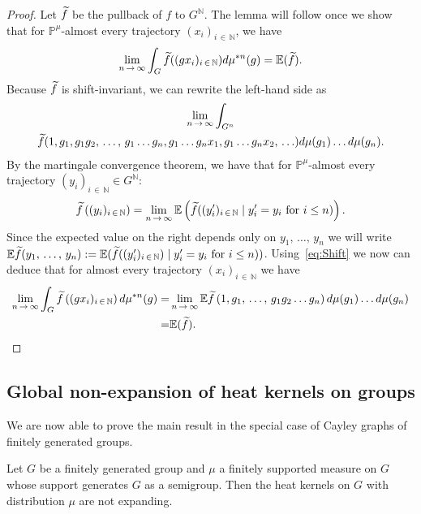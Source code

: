 \documentclass[AHL,Unicode,longabstracts,published]{cedram}
\newcommand{\bbN}{\mathbb{N}}
\newcommand{\bbE}{\mathbb{E}}
\newcommand{\bbP}{\mathbb{P}}
\let\oldtilde\tilde
\renewcommand*{\tilde}[1]{\mathchoice{\widetilde{#1}}{\widetilde{#1}}{\oldtilde{#1}}{\oldtilde{#1}}}
\begin{document}
\begin{proof}
Let $\tilde f$ be the pullback of $f$ to $G^\bbN$. The lemma will follow once we show that for $\bbP^\mu$-almost every trajectory $(x_i)_{i\,\in\,\bbN}$, we have
\[
\lim_{n\,\to\,\infty}\int_G \tilde f((gx_i)_{i\,\in\,\bbN})d\mu^{\ast n}(g)=\bbE(\tilde f).
\]
Because $\tilde f$ is shift-invariant, we can rewrite the left-hand side as
\begin{multline}\label{eq:Shift}
\lim_{n\,\to\,\infty}\int_{G^n}\\ \tilde f(1,g_1,g_1g_2,\,\ldots,\,g_1\ldots g_n,g_1\ldots g_nx_1,g_1\ldots g_nx_2,\,\ldots) d\mu(g_1)\ldots d\mu(g_n).
\end{multline}
By the martingale convergence theorem, we have that for $\bbP^\mu$-almost every trajectory $(y_i)_{i\,\in\,\bbN}\in G^\bbN$:
\[
\tilde{f}\left((y_i)_{i\,\in\,\bbN}\right)=\lim_{n\,\to\,\infty}\bbE\left(\tilde f((y_i')_{i\,\in\,\bbN} \mid y_i'=y_i \text{ for } i\leq n)\right).
\]
Since the expected value on the right depends only on $y_1,\,\ldots,\,y_n$ we will write $\bbE \tilde f(y_1,\,\ldots,\,y_n):=\bbE(\tilde f((y_i')_{i\,\in\,\bbN}) \mid y_i'=y_i \text{ for } i\leq n))$. Using~\eqref{eq:Shift} we now can deduce that for almost every trajectory $(x_i)_{i\,\in\,\bbN}$ we have
\begin{align*}
\lim_{n\,\to\,\infty}\int_G \tilde f\left((gx_i)_{i\,\in\,\bbN}\right)d\mu^{\ast n}(g)=&\lim_{n\,\to\,\infty}\bbE \tilde{f}\left(1,g_1,\,\ldots,\,g_1g_2\ldots g_n\right)d\mu(g_1)\ldots d\mu(g_n)\\=&\bbE(\tilde f).
\end{align*}
\end{proof}

\subsection{Global non-expansion of heat kernels on groups} 

We are now able to prove the main result in the special case of Cayley graphs of finitely generated groups.

\begin{theo}\label{thm:mainGp}
Let $G$ be a finitely generated group and $\mu$ a finitely supported measure on $G$ whose support generates $G$ as a semigroup. Then the heat kernels on $G$ with distribution $\mu$ are not expanding.
\end{theo}
\end{document}
